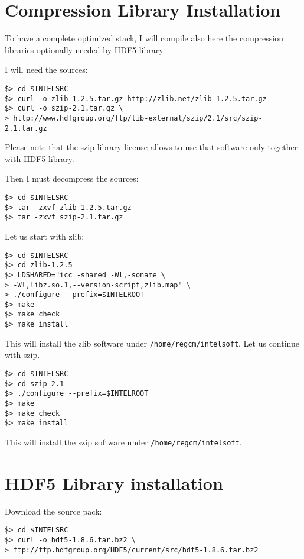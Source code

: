 \section{Compression Library Installation}

To have a complete optimized stack, I will compile also here the compression
libraries optionally needed by HDF5 library.

I will need the sources:

\begin{Verbatim}
$> cd $INTELSRC
$> curl -o zlib-1.2.5.tar.gz http://zlib.net/zlib-1.2.5.tar.gz
$> curl -o szip-2.1.tar.gz \
> http://www.hdfgroup.org/ftp/lib-external/szip/2.1/src/szip-2.1.tar.gz
\end{Verbatim}

Please note that the szip library license allows to use that software only
together with HDF5 library.

Then I must decompress the sources:

\begin{Verbatim}
$> cd $INTELSRC
$> tar -zxvf zlib-1.2.5.tar.gz
$> tar -zxvf szip-2.1.tar.gz
\end{Verbatim}

Let us start with zlib:

\begin{Verbatim}
$> cd $INTELSRC
$> cd zlib-1.2.5
$> LDSHARED="icc -shared -Wl,-soname \
> -Wl,libz.so.1,--version-script,zlib.map" \
> ./configure --prefix=$INTELROOT
$> make
$> make check
$> make install
\end{Verbatim}

This will install the zlib software under \verb=/home/regcm/intelsoft=.
Let us continue with szip.

\begin{Verbatim}
$> cd $INTELSRC
$> cd szip-2.1
$> ./configure --prefix=$INTELROOT
$> make
$> make check
$> make install
\end{Verbatim}

This will install the szip software under \verb=/home/regcm/intelsoft=.

\section{HDF5 Library installation}

Download the source pack:

\begin{Verbatim}
$> cd $INTELSRC
$> curl -o hdf5-1.8.6.tar.bz2 \
> ftp://ftp.hdfgroup.org/HDF5/current/src/hdf5-1.8.6.tar.bz2
\end{Verbatim}

